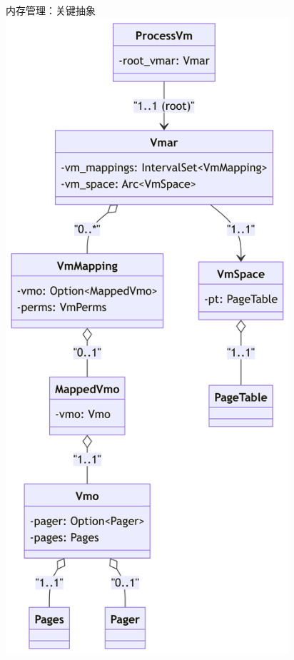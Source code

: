 \documentclass[
  ignorenonframetext,
]{beamer}
\begin{document}
\begin{frame}
\begin{block}{内存管理：关键抽象}
\label{ux5185ux5b58ux7ba1ux7406ux5173ux952eux62bdux8c61}
\includegraphics[width=4.13in,height=9.3in]{slide_files/figure-beamer/mermaid-figure-2.png}
\end{block}
\end{frame}
\end{document}
